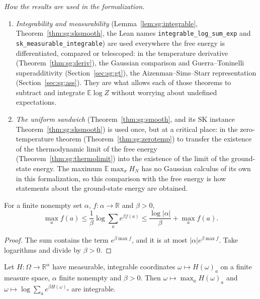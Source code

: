\begin{remark}
\emph{How the results are used in the formalization.}
\begin{enumerate}
\item \emph{Integrability and measurability} (Lemma~\ref{lem:sg:integrable}, Theorem~\ref{thm:sg:sksmooth}, the Lean names \texttt{integrable\_log\_sum\_exp} and \texttt{sk\_measurable\_integrable}) are used everywhere the free energy is differentiated, compared or telescoped:
  in the temperature derivative (Theorem~\ref{thm:sg:deriv}), the Gaussian comparison and Guerra--Toninelli superadditivity (Section~\ref{sec:sg:gt}), the Aizenman--Sims--Starr representation (Section~\ref{sec:sg:ass}).
  They are what allows each of those theorems to subtract and integrate $\mathbb E\log Z$ without worrying about undefined expectations.
\item \emph{The uniform sandwich} (Theorem~\ref{thm:sg:smooth}, and its SK instance Theorem~\ref{thm:sg:sksmooth}) is used once, but at a critical place: in the zero-temperature theorem (Theorem~\ref{thm:sg:zerotemp}) to transfer the existence of the thermodynamic limit of the free energy
  (Theorem~\ref{thm:sg:thermolimit}) into the existence of the limit of the ground-state energy. The maximum $\mathbb E\max_\sigma H_N$ has no Gaussian calculus of its own in this formalization, so this comparison with the free energy is how statements about the ground-state energy are obtained.
\end{enumerate}
\end{remark}

\begin{lemma}\label{lem:sg:lse}
  \leanok
For a finite nonempty set $\alpha$, $f:\alpha\to\mathbb R$ and $\beta>0$,
\[\max_a f(a)\le\frac1\beta\log\sum_a e^{\beta f(a)}\le\frac{\log|\alpha|}{\beta}+\max_a f(a).\]
\end{lemma}

\begin{proof}
  \leanok
The sum contains the term $e^{\beta\max f}$, and it is at most $|\alpha|e^{\beta\max f}$. Take logarithms and divide
by $\beta>0$.
\end{proof}

\begin{lemma}\label{lem:sg:integrable}
  \leanok
Let $H:\Omega\to\mathbb R^\alpha$ have measurable, integrable coordinates $\omega\mapsto H(\omega)_a$ on a finite
measure space, $\alpha$ finite nonempty and $\beta>0$. Then $\omega\mapsto\max_aH(\omega)_a$ and
$\omega\mapsto\log\sum_ae^{\beta H(\omega)_a}$ are integrable.
\end{lemma}

